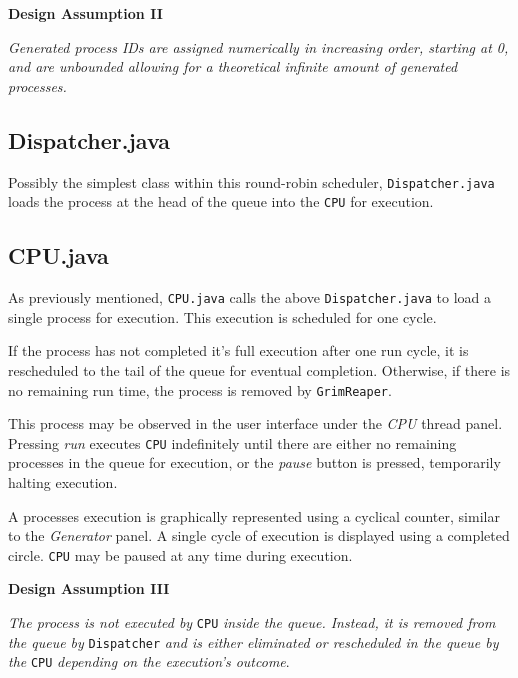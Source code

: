 \documentclass[]{report}
\begin{document}
\begin{mdframed}[backgroundcolor=lightgray!40]
	\textbf{Design Assumption II} \par 
	\textit{Generated process IDs are assigned numerically in increasing order, starting at 0, and are unbounded allowing for a theoretical infinite amount of generated processes.}
\end{mdframed}

\vspace{2mm}

\subsection*{Dispatcher.java}
Possibly the simplest class within this round-robin scheduler, \verb|Dispatcher.java| loads the process at the head of the queue into the \verb|CPU| for execution.

\vspace{2mm}

\subsection*{CPU.java}
As previously mentioned, \verb|CPU.java| calls the above \verb|Dispatcher.java| to load a single process for execution. This execution is scheduled for one cycle. \par 
If the process has not completed it's full execution after one run cycle, it is rescheduled to the tail of the queue for eventual completion. Otherwise, if there is no remaining run time, the process is removed by \verb|GrimReaper|. \par 
This process may be observed in the user interface under the \textit{CPU} thread panel. Pressing \textit{run} executes \verb|CPU| indefinitely until there are either no remaining processes in the queue for execution, or the \textit{pause} button is pressed, temporarily halting execution. \par 
A processes execution is graphically represented using a cyclical counter, similar to the \textit{Generator} panel. A single cycle of execution is displayed using a completed circle. \verb|CPU| may be paused at any time during execution.

\newpage 

\begin{mdframed}[backgroundcolor=lightgray!40]
	\textbf{Design Assumption III} \par 
	\textit{The process is not executed by} \verb|CPU| \textit{inside the queue. Instead, it is removed from the queue by} \verb|Dispatcher| \textit{and is either eliminated or rescheduled in the queue by the} \verb|CPU| \textit{depending on the execution's outcome}.
\end{mdframed}
\end{document}
